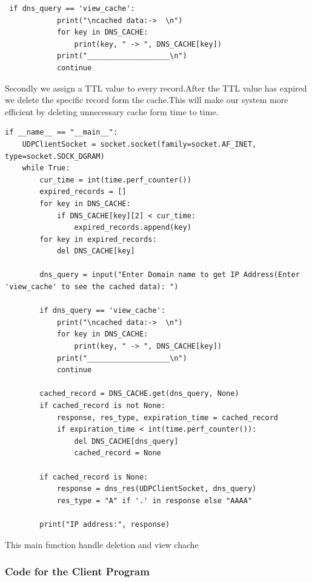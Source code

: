 \documentclass[11pt]{article}
\begin{document}
\begin{verbatim}
 if dns_query == 'view_cache':
            print("\ncached data:->  \n")
            for key in DNS_CACHE:
                print(key, " -> ", DNS_CACHE[key])
            print("___________________\n")
            continue
\end{verbatim}

Secondly we assign a TTL value to every record.After the TTL value has expired we delete the specific record form the cache.This will make our system more efficient by deleting unnecessary cache form time to time.

\begin{verbatim}
if __name__ == "__main__":
    UDPClientSocket = socket.socket(family=socket.AF_INET, type=socket.SOCK_DGRAM)
    while True:
        cur_time = int(time.perf_counter())
        expired_records = []
        for key in DNS_CACHE:
            if DNS_CACHE[key][2] < cur_time:
                expired_records.append(key)
        for key in expired_records:
            del DNS_CACHE[key]

        dns_query = input("Enter Domain name to get IP Address(Enter 'view_cache' to see the cached data): ")

        if dns_query == 'view_cache':
            print("\ncached data:->  \n")
            for key in DNS_CACHE:
                print(key, " -> ", DNS_CACHE[key])
            print("___________________\n")
            continue

        cached_record = DNS_CACHE.get(dns_query, None)
        if cached_record is not None:
            response, res_type, expiration_time = cached_record
            if expiration_time < int(time.perf_counter()):
                del DNS_CACHE[dns_query]
                cached_record = None

        if cached_record is None:
            response = dns_res(UDPClientSocket, dns_query)
            res_type = "A" if '.' in response else "AAAA"

        print("IP address:", response)
\end{verbatim}

This main function handle deletion and view chache

\subsubsection{Code for the Client Program}
\end{document}
